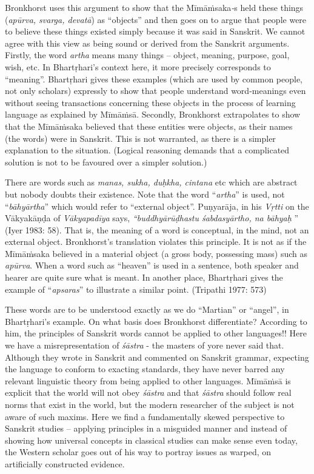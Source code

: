 Bronkhorst uses this argument to show that the Mīmāṁsaka\textit{-}s held these things (\textit{apūrva, svarga, devatā}) as “objects” and then goes on to argue that people were to believe these things existed simply because it was said in Sanskrit. We cannot agree with this view as being sound or derived from the Sanskrit arguments. Firstly, the word \textit{artha} means many things -- object, meaning, purpose, goal, wish, etc. In Bhartṛhari’s context here, it more precisely corresponds to “meaning”. Bhartṛhari gives these examples (which are used by common people, not only scholars) expressly to show that people understand word-meanings even without seeing transactions concerning these objects in the process of learning language as explained by Mīmāṁsā. Secondly, Bronkhorst extrapolates to show that the Mīmāṁsaka believed that these entities were objects, as their names (the words) were in Sanskrit. This is not warranted, as there is a simpler explanation to the situation. (Logical reasoning demands that a complicated solution is not to be favoured over a simpler solution.)

There are words such as \textit{manas, sukha, duḥkha, cintana} etc which are abstract but nobody doubts their existence. Note that the word “\textit{artha}” is used, not “\textit{bāhyārtha}” which would refer to “external object”. Puṇyarāja, in his \textit{Vṛtti} on the {Vākyakāṇḍa} of \textit{Vākyapadīya} says, \textit{“buddhyārūḍhastu śabdasyārtho, na bāhyaḥ} ” (Iyer 1983: 58). That is, the meaning of a word is conceptual, in the mind, not an external object. Bronkhorst’s translation violates this principle. It is not as if the Mīmāṁsaka believed in a material object (a gross body, possessing mass) such as \textit{apūrva}. When a word such as “heaven” is used in a sentence, both speaker and hearer are quite sure what is meant. In another place, Bhartṛhari gives the example of “\textit{apsaras}” to illustrate a similar point. (Tripathi 1977: 573)

These words are to be understood exactly as we do “Martian” or “angel”, in Bhartṛhari’s example. On what basis does Bronkhorst differentiate? According to him, the principles of Sanskrit words cannot be applied to other languages!! Here we have a misrepresentation of \textit{śāstra} - the masters of yore never said that. Although they wrote in Sanskrit and commented on Sanskrit grammar, expecting the language to conform to exacting standards, they have never barred any relevant linguistic theory from being applied to other languages. Mīmāṁsā is explicit that the world will not obey \textit{śāstra} and that \textit{śāstra} should follow real norms that exist in the world, but the modern researcher of the subject is not aware of such maxims. Here we find a fundamentally skewed perspective to Sanskrit studies – applying principles in a misguided manner and instead of showing how universal concepts in classical studies can make sense even today, the Western scholar goes out of his way to portray issues as warped, on artificially constructed evidence.

